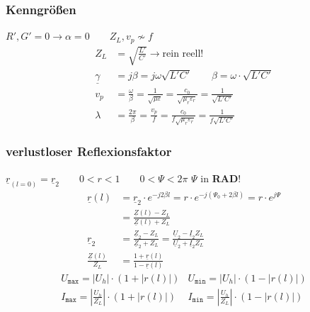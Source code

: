 \subsubsection{Kenngrößen}
$ R', G' = 0 \rightarrow \alpha = 0 \qquad Z_L, v_p \nsim f$
\begin{align*}
	Z_L                & =  \sqrt{\frac{L'}{C'}} \rightarrow \text{rein reell!}                                                                  \\
	\underline{\gamma} & = j \beta  = j \omega \sqrt{L'C'} \qquad \beta = \omega \cdot \sqrt{L'C'}                                               \\
	v_p                & = \frac{\omega}{\beta} = \frac{1}{\sqrt{\mu\varepsilon}}= \frac{c_0}{\sqrt{\mu_r\varepsilon_r}} = \frac{1}{\sqrt{L'C'}} \\
	\lambda            & = \frac{2\pi}{\beta}= \frac{v_p}{f}= \frac{c_0}{f\sqrt{\mu_r\varepsilon_r}}=\frac{1}{f\sqrt{L'C'}}
\end{align*}

\subsubsection{verlustloser Reflexionsfaktor}\label{sec:verlustlos_rfaktor}
$ \underline{r}_{(l=0)} = \underline{r}_2 \qquad 0<r<1 \qquad 0<\Psi<2\pi $ \quad  $\Psi$ in \textbf{RAD}!
\begin{align*}
	\underline{r}(l)              & = \underline{r}_2 \cdot e^{-j2\beta l} = r \cdot e^{-j(\Psi_0+2\beta l)} =r\cdot e^{j\Psi}                                            \\ &=\tfrac{\underline{Z}(l)-Z_L}{\underline{Z}(l)+Z_L}\\
	\underline{r}_2               & = \tfrac{\underline{Z}_2-Z_L}{\underline{Z}_2+Z_L} = \tfrac{\underline{U}_2-\underline{I}_2Z_L}{\underline{U}_2 +\underline{I}_2 Z_L} \\
	\tfrac{\underline{Z}(l)}{Z_L} & = \tfrac{1+\underline{r}(l)}{1-\underline{r}(l)}
\end{align*}
\begin{align*}
	 & U_{\texttt{max}} = |U_h| \cdot (1+|r(l)|)                            & U_{\texttt{min}} = |U_h| \cdot (1-|r(l)|)                           & \\
	 & I_{\texttt{max}} = \left | \frac{U_h}{Z_L} \right | \cdot (1+|r(l)|) & I_{\texttt{min}} = \left| \frac{U_h}{Z_L} \right | \cdot (1-|r(l)|) &
\end{align*}

